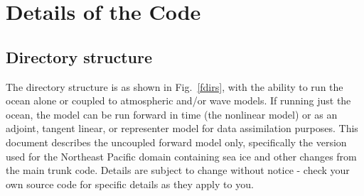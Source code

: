 \section{Details of the Code}
\label{Code}
\subsection{Directory structure}
The directory structure is as shown in Fig.\ \ref{fdirs}, with the
ability to run the ocean alone or coupled to atmospheric and/or
wave models. If running just the ocean, the model can be run forward
in time (the nonlinear model) or as an adjoint, tangent linear, or
representer model for data assimilation purposes. This document
describes the uncoupled forward model only, specifically the version
used for the Northeast Pacific domain containing sea ice and other
changes from the main trunk code. Details are subject to change
without notice - check your own source code for specific details as
they apply to you.

